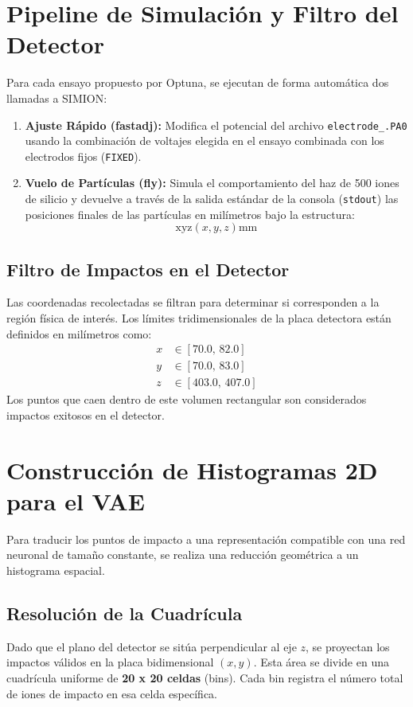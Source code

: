 \documentclass[12pt,letterpaper]{article}
\begin{document}
\section{Pipeline de Simulación y Filtro del Detector}
Para cada ensayo propuesto por Optuna, se ejecutan de forma automática dos llamadas a SIMION:

\begin{enumerate}
    \item \textbf{Ajuste Rápido (fastadj):} Modifica el potencial del archivo \texttt{electrode\_.PA0} usando la combinación de voltajes elegida en el ensayo combinada con los electrodos fijos (\texttt{FIXED}).
    \item \textbf{Vuelo de Partículas (fly):} Simula el comportamiento del haz de 500 iones de silicio y devuelve a través de la salida estándar de la consola (\texttt{stdout}) las posiciones finales de las partículas en milímetros bajo la estructura:
    \begin{equation}
        \text{xyz}(x, y, z)\text{mm}
    \end{equation}
\end{enumerate}

\subsection{Filtro de Impactos en el Detector}
Las coordenadas recolectadas se filtran para determinar si corresponden a la región física de interés. Los límites tridimensionales de la placa detectora están definidos en milímetros como:
\begin{align*}
    x &\in [70.0,\, 82.0] \\
    y &\in [70.0,\, 83.0] \\
    z &\in [403.0,\, 407.0]
\end{align*}
Los puntos que caen dentro de este volumen rectangular son considerados impactos exitosos en el detector.

\section{Construcción de Histogramas 2D para el VAE}
Para traducir los puntos de impacto a una representación compatible con una red neuronal de tamaño constante, se realiza una reducción geométrica a un histograma espacial.

\subsection{Resolución de la Cuadrícula}
Dado que el plano del detector se sitúa perpendicular al eje $z$, se proyectan los impactos válidos en la placa bidimensional $(x, y)$. Esta área se divide en una cuadrícula uniforme de \textbf{20 x 20 celdas} (bins). Cada bin registra el número total de iones de impacto en esa celda específica.
\end{document}
